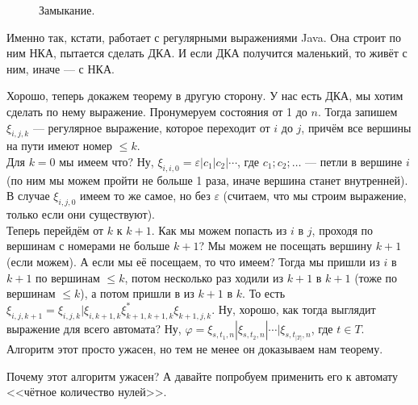 \documentclass{article}
\begin{document}
\begin{itemize}
\begin{Proof}
\begin{figure}[H]
                \caption*{Замыкание.}
            \end{figure}\noindent
            \begin{Comment}
                Именно так, кстати, работает с регулярными выражениями Java. Она строит по ним НКА, пытается сделать ДКА. И если ДКА получится маленький, то живёт с ним, иначе --- с НКА.
            \end{Comment}
            Хорошо, теперь докажем теорему в другую сторону. У нас есть ДКА, мы хотим сделать по нему выражение. Пронумеруем состояния от 1 до $n$. Тогда запишем $\xi_{i,j,k}$ --- регулярное выражение, которое переходит от $i$ до $j$, причём все вершины на пути имеют номер $\leqslant k$.\\
            Для $k=0$ мы имеем что? Ну, $\xi_{i,i,0}=\varepsilon|c_1|c_2|\cdots$, где $c_1;c_2;\ldots$ --- петли в вершине $i$ (по ним мы можем пройти не больше 1 раза, иначе вершина станет внутренней). В случае $\xi_{i,j,0}$ имеем то же самое, но без $\varepsilon$ (считаем, что мы строим выражение, только если они существуют).\\
            Теперь перейдём от $k$ к $k+1$. Как мы можем попасть из $i$ в $j$, проходя по вершинам с номерами не больше $k+1$? Мы можем не посещать вершину $k+1$ (если можем). А если мы её посещаем, то что имеем? Тогда мы пришли из $i$ в $k+1$ по вершинам $\leqslant k$, потом несколько раз ходили из $k+1$ в $k+1$ (тоже по вершинам $\leqslant k$), а потом пришли в из $k+1$ в $k$. То есть $\xi_{i,j,k+1}=\xi_{i,j,k}|\xi_{i,k+1,k}\xi^*_{k+1,k+1,k}\xi_{k+1,j,k}$. Ну, хорошо, как тогда выглядит выражение для всего автомата? Ну, $\varphi=\xi_{s,t_1,n}|\xi_{s,t_2,n}|\cdots|\xi_{s,t_{|T|},n}$, где $t\in T$. Алгоритм этот просто ужасен, но тем не менее он доказываем нам теорему.
            \begin{Comment}
                Почему этот алгоритм ужасен? А давайте попробуем применить его к автомату <<чётное количество нулей>>.
                \begin{figure}[H]
\end{figure}
\end{Comment}
\end{Proof}
\end{itemize}
\end{document}
